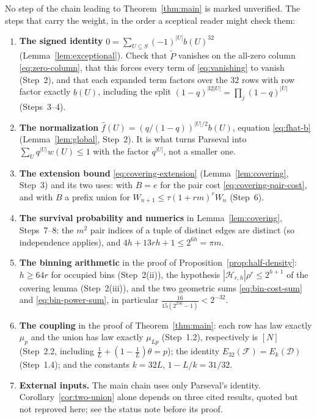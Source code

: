 \documentclass[11pt,letterpaper]{article}
\theoremstyle{definition}
\theoremstyle{remark}
\numberwithin{equation}{section}
\begin{document}
No step of the chain leading to Theorem~\ref{thm:main} is marked
unverified. The steps that carry the weight, in the order a sceptical
reader might check them:

\begin{enumerate}[label=\arabic*.]
\item \textbf{The signed identity}
$0=\sum_{U\subseteq S}(-1)^{|U|}b(U)^{32}$
(Lemma~\ref{lem:exceptional}). Check that $\widetilde P$ vanishes on the
all-zero column \eqref{eq:zero-column}, that this forces every term of
\eqref{eq:vanishing} to vanish (Step~2), and that each expanded term
factors over the $32$ rows with row factor exactly $b(U)$, including the
split $(1-q)^{32|U|}=\prod_j(1-q)^{|U|}$ (Steps~3--4).
\item \textbf{The normalization}
$\widehat f(U)=(q/(1-q))^{|U|/2}b(U)$, equation \eqref{eq:fhat-b}
(Lemma~\ref{lem:global}, Step~2). It is what turns Parseval into
$\sum_Uq^{|U|}w(U)\le1$ with the factor $q^{|U|}$, not a smaller one.
\item \textbf{The extension bound} \eqref{eq:covering-extension}
(Lemma~\ref{lem:covering}, Step~3) and its two uses: with $B=e$ for the
pair cost \eqref{eq:covering-pair-cost}, and with $B$ a prefix union for
$W_{n+1}\le\tau(1+rm)^rW_n$ (Step~6).
\item \textbf{The survival probability and numerics} in
Lemma~\ref{lem:covering}, Steps~7--8: the $m^2$ pair indices of a tuple of
distinct edges are distinct (so independence applies), and
$4h+13rh+1\le2^{6h}=\pi m$.
\item \textbf{The binning arithmetic} in the proof of
Proposition~\ref{prop:half-density}: $h\ge64r$ for occupied bins
(Step~2(ii)), the hypothesis $|\mathcal H_{r,h}|\rho^r\le2^{h+1}$ of the
covering lemma (Step~2(iii)), and the two geometric sums
\eqref{eq:bin-cost-sum} and \eqref{eq:bin-power-sum}, in particular
$\frac{16}{15(2^{256}-1)}<2^{-32}$.
\item \textbf{The coupling} in the proof of Theorem~\ref{thm:main}: each
row has law exactly $\mu_p$ and the union has law exactly $\mu_{Lp}$
(Step~1.2), respectively is $[N]$ (Step~2.2, including
$\tfrac1L+(1-\tfrac1L)\theta=p$); the identity
$E_{32}(\mathcal F)=E_k(\mathcal D)$ (Step~1.4); and the constants
$k=32L$, $1-L/k=31/32$.
\item \textbf{External inputs.} The main chain uses only Parseval's
identity. Corollary~\ref{cor:two-union} alone depends on three cited
results, quoted but not reproved here; see the status note before its
proof.
\end{enumerate}
\end{document}
